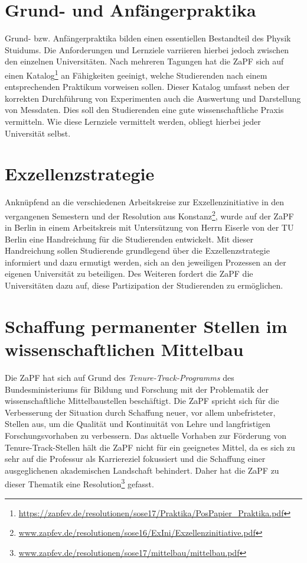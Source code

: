 \documentclass[a4paper]{article}
\begin{document}
\section*{Grund- und Anfängerpraktika}
Grund- bzw. Anfängerpraktika bilden einen essentiellen Bestandteil des Physik Stuidums. Die Anforderungen und Lernziele varriieren hierbei jedoch zwischen den einzelnen Universitäten. Nach mehreren Tagungen hat die ZaPF sich auf einen Katalog\footnote{\href{https://zapfev.de/resolutionen/sose17/Praktika/PosPapier_Praktika.pdf}{\url{https://zapfev.de/resolutionen/sose17/Praktika/PosPapier_Praktika.pdf}}} an Fähigkeiten geeinigt, welche Studierenden nach einem entsprechenden Praktikum vorweisen sollen. Dieser Katalog umfasst neben der korrekten Durchführung von Experimenten auch die Auswertung und Darstellung von Messdaten. Dies soll den Studierenden eine gute wissenschaftliche Praxis vermitteln. 
Wie diese Lernziele vermittelt werden, obliegt hierbei jeder Universität selbst.

\section*{Exzellenzstrategie}
Anknüpfend an die verschiedenen Arbeitskreise zur Exzellenzinitiative in den vergangenen Semestern  und der Resolution aus Konstanz\footnote{\href{https://zapfev.de/resolutionen/sose16/ExIni/Exzellenzinitiative.pdf}{\url{www.zapfev.de/resolutionen/sose16/ExIni/Exzellenzinitiative.pdf}}}, wurde auf der ZaPF in Berlin in einem Arbeitskreis mit Untersützung von Herrn Eiserle von der TU Berlin eine Handreichung für die Studierenden entwickelt. Mit dieser Handreichung sollen Studierende grundlegend über die Exzellenzstrategie informiert und dazu ermutigt werden, sich an den jeweiligen Prozessen an der eigenen Universität zu beteiligen. Des Weiteren fordert die ZaPF die Universitäten dazu auf, diese Partizipation der Studierenden zu ermöglichen. 

\section*{Schaffung permanenter Stellen im wissenschaftlichen Mittelbau}
Die ZaPF hat sich auf Grund des \emph{Tenure-Track-Programms} des Bundesministeriums für Bildung und Forschung mit der Problematik der wissenschaftliche Mittelbaustellen beschäftigt. Die ZaPF spricht sich für die Verbesserung der Situation durch Schaffung neuer, vor allem unbefristeter, Stellen aus, um die Qualität und Kontinuität von Lehre und langfristigen Forschungsvorhaben zu verbessern. Das aktuelle Vorhaben zur Förderung von Tenure-Track-Stellen hält die ZaPF nicht für ein geeignetes Mittel, da es sich zu sehr auf die Professur als Karriereziel fokussiert und die Schaffung einer ausgeglichenen akademischen Landschaft behindert. Daher hat die ZaPF zu dieser Thematik eine Resolution\footnote{\href{https://zapfev.de/resolutionen/sose17/mittelbau/mittelbau.pdf}{\url{www.zapfev.de/resolutionen/sose17/mittelbau/mittelbau.pdf}}} gefasst.
\end{document}
